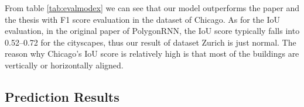 From table \ref{tab:evalmodex} we can see that our model outperforms the paper \cite{mspascal} and the thesis \cite{msnadine} with F1 score evaluation in the dataset of Chicago. As for the IoU evaluation, in the original paper of PolygonRNN, the IoU score typically falls into 0.52--0.72 for the cityscapes, thus our result of dataset Zurich is just normal. The reason why Chicago’s IoU score is relatively high is that most of the buildings are vertically or horizontally aligned.

\subsection{Prediction Results}\label{predres}





